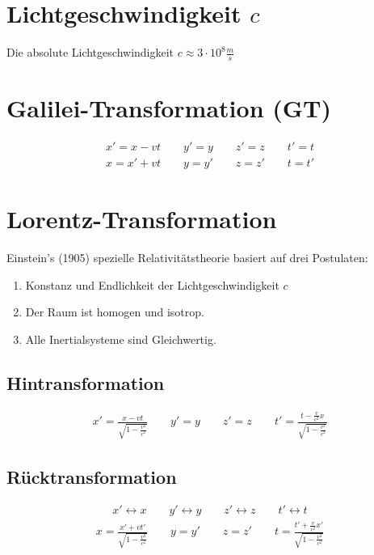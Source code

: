 %
%

\section{Lichtgeschwindigkeit $c$}
Die absolute Lichtgeschwindigkeit $c\approx 3\cdot10^8 \unit{\frac{m}{s}}$

\section{Galilei-Transformation (GT)}
\begin{gather*}
	x'=x-vt\qquad y'=y\qquad z'=z\qquad t'=t \\
	x = x'+vt\qquad y=y'\qquad z=z'\qquad t=t'
\end{gather*}

\section{Lorentz-Transformation}
Einstein's (1905) spezielle Relativit\"atstheorie basiert auf drei Postulaten:
\begin{enumerate}
	\item Konstanz und Endlichkeit der Lichtgeschwindigkeit $c$
	\item Der Raum ist homogen und isotrop.
	\item Alle  Inertialsysteme sind Gleichwertig.
\end{enumerate}

\subsection{Hintransformation}
\begin{gather}
	x'=\frac{x-vt}{\sqrt{1-\frac{v^2}{c^2}}}\qquad y'=y\qquad z'=z\qquad t'=\frac{t-\frac{v}{c^2}x}{\sqrt{1-\frac{v^2}{c^2}}}
\end{gather}

\subsection{R\"ucktransformation}
\begin{gather*}
	x'\leftrightarrow x\qquad y'\leftrightarrow y\qquad z'\leftrightarrow z\qquad t'\leftrightarrow t
\end{gather*}
\begin{gather}
	x=\frac{x'+vt'}{\sqrt{1-\frac{v^2}{c^2}}}\qquad y=y'\qquad z=z'\qquad t=\frac{t'+\frac{v}{c^2}x'}{\sqrt{1-\frac{v^2}{c^2}}}
\end{gather}

